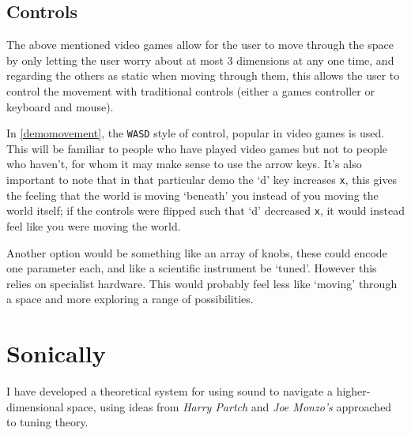 \subsection{Controls}
The above mentioned video games allow for the user to move through the space by
only letting the user worry about at most 3 dimensions at any one time, and
regarding the others as static when moving through them, this allows the user to
control the movement with traditional controls (either a games controller or
keyboard and mouse).

In \autoref{demomovement}, the \verb|WASD| style of control, popular in video
games is used. This will be familiar to people who have played video games but
not to people who haven't, for whom it may make sense to use the arrow keys.
It's also important to note that in that particular demo the `d' key increases
\verb|x|, this gives the feeling that the world is moving `beneath' you instead
of you moving the world itself; if the controls were flipped such that `d'
decreased \verb|x|, it would instead feel like you were moving the world. 

Another option would be something like an array of knobs, these could encode one
parameter each, and like a scientific instrument be `tuned'. However this relies
on specialist hardware. This would probably feel less like `moving' through a
space and more exploring a range of possibilities.

\section{Sonically}
\label{sonicnav}
I have developed a theoretical system for using sound to navigate a
higher-dimensional space, using ideas from \emph{Harry Partch} and \emph{Joe
Monzo's} approached to tuning theory.

